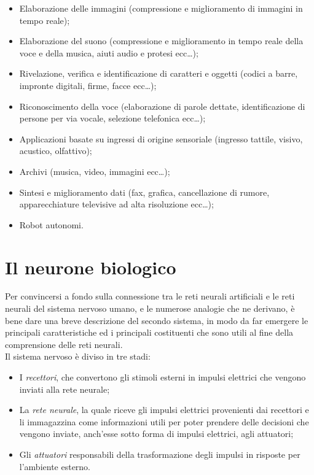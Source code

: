 \documentclass[12pt,a4paper,oneside]{book}
\begin{document}
		\begin{itemize}
			\item Elaborazione delle immagini (compressione e miglioramento di immagini in tempo reale);
			\item Elaborazione del suono (compressione e miglioramento in tempo reale della voce e della musica, aiuti audio e protesi ecc\dots);
			\item Rivelazione, verifica e identificazione di caratteri e oggetti (codici a barre, impronte digitali, firme, facce ecc\dots );  
			\item Riconoscimento della voce (elaborazione di parole dettate, identificazione di persone per via vocale, selezione telefonica ecc\dots );
			\item Applicazioni basate su ingressi di origine sensoriale (ingresso tattile, visivo, acustico, olfattivo);
			\item Archivi (musica, video, immagini ecc\dots);
			\item Sintesi e miglioramento dati (fax, grafica, cancellazione di rumore, apparecchiature televisive ad alta risoluzione ecc\dots);
			\item Robot autonomi.
		\end{itemize}

		
		

		\section{Il neurone biologico}
		
		Per convincersi a fondo sulla connessione tra le reti neurali artificiali e le reti neurali del sistema nervoso umano, e le numerose analogie che ne derivano, è bene dare una breve descrizione del secondo sistema, in modo da far emergere le principali caratteristiche ed i principali costituenti che sono utili al fine della comprensione delle reti neurali.\\
  	    \clearpage
  		Il sistema nervoso è diviso in tre stadi:
		
		\begin{itemize}
			\item I \emph{recettori}, che convertono gli stimoli esterni in impulsi elettrici che vengono inviati alla rete neurale;
			\item La \emph{rete neurale}, la quale riceve gli impulsi elettrici provenienti dai recettori e li immagazzina come informazioni utili per poter prendere delle decisioni che vengono inviate, anch'esse sotto forma di impulsi elettrici, agli attuatori;
			\item Gli \emph{attuatori} responsabili della trasformazione degli impulsi in risposte per l'ambiente esterno.
		\end{itemize}
	
\end{document}
